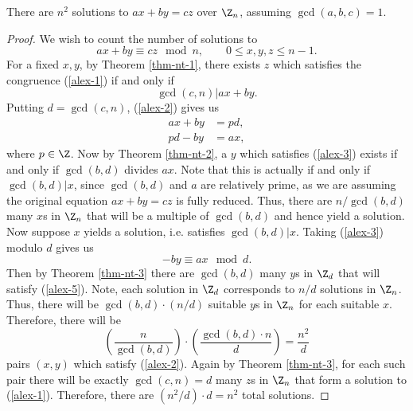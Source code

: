 \begin{lemma}\label{lem-solns-Zn}
There are $n^2$ solutions to $ax + by = cz$ over $\Z_n$, assuming $\gcd(a,b,c) = 1$.
\end{lemma}

\begin{proof}
        We wish to count the number of solutions to
            \begin{equation}\label{alex-1}
                ax + by \equiv cz \mod{n}, \qquad 0 \leq x, y, z \leq n - 1.
            \end{equation}
        For a fixed $x, y$, by Theorem \ref{thm-nt-1}, there exists $z$ which satisfies the congruence (\ref{alex-1}) if and only if
            \begin{equation}\label{alex-2}
                \gcd(c,n) | ax + by.
            \end{equation}
        Putting $d = \gcd(c,n)$, (\ref{alex-2}) gives us
            \begin{equation}\label{alex-3}
                \begin{split}
                    ax + by &= pd,\\
                    pd - by &= ax,
                \end{split}
            \end{equation}
        where $p \in \Z$. Now by Theorem \ref{thm-nt-2}, a $y$ which satisfies (\ref{alex-3}) exists if and only if $\gcd(b,d)$ divides $ax$. Note that
        this is actually if and only if $\gcd(b,d) | x$, since $\gcd(b,d)$ and $a$ are relatively prime,
        as we are assuming the original equation $ax + by = cz$ is fully reduced. 
        Thus, there are $n /\gcd(b,d)$
        many $x$s in $\Z_n$ that will be a multiple of $\gcd(b,d)$ and hence yield a solution. 
        Now suppose $x$ yields a solution, i.e. satisfies $\gcd(b,d)|x$. Taking (\ref{alex-3}) modulo $d$ gives us
            \begin{equation}\label{alex-5}
                -by \equiv ax \mod{d}.
            \end{equation}
        Then by Theorem \ref{thm-nt-3} there are $\gcd(b,d)$ many $y$s in $\Z_d$ that will satisfy (\ref{alex-5}). Note, each solution in $\Z_d$ corresponds to $n/d$ solutions in $\Z_n$. Thus, there will be $\gcd(b,d) \cdot (n/d)$ suitable $y$s in $\Z_n$ for each suitable $x$. Therefore, there will be
            $$\left( \frac{n}{\gcd(b,d)} \right) \cdot \left( \frac{\gcd(b,d) \cdot n}{d} \right) = \frac{n^2}{d}$$
        pairs $(x,y)$ which satisfy (\ref{alex-2}). Again by Theorem \ref{thm-nt-3}, for each such pair there will be exactly $\gcd(c,n) = d$ many $z$s in $\Z_n$ that form a solution to (\ref{alex-1}). Therefore, there are
            $(n^2 / d) \cdot d = n^2$ total solutions.
\end{proof}

